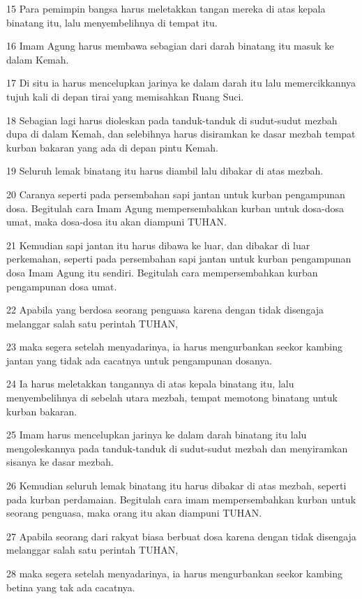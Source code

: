 \par 15 Para pemimpin bangsa harus meletakkan tangan mereka di atas kepala binatang itu, lalu menyembelihnya di tempat itu.
\par 16 Imam Agung harus membawa sebagian dari darah binatang itu masuk ke dalam Kemah.
\par 17 Di situ ia harus mencelupkan jarinya ke dalam darah itu lalu memercikkannya tujuh kali di depan tirai yang memisahkan Ruang Suci.
\par 18 Sebagian lagi harus dioleskan pada tanduk-tanduk di sudut-sudut mezbah dupa di dalam Kemah, dan selebihnya harus disiramkan ke dasar mezbah tempat kurban bakaran yang ada di depan pintu Kemah.
\par 19 Seluruh lemak binatang itu harus diambil lalu dibakar di atas mezbah.
\par 20 Caranya seperti pada persembahan sapi jantan untuk kurban pengampunan dosa. Begitulah cara Imam Agung mempersembahkan kurban untuk dosa-dosa umat, maka dosa-dosa itu akan diampuni TUHAN.
\par 21 Kemudian sapi jantan itu harus dibawa ke luar, dan dibakar di luar perkemahan, seperti pada persembahan sapi jantan untuk kurban pengampunan dosa Imam Agung itu sendiri. Begitulah cara mempersembahkan kurban pengampunan dosa umat.
\par 22 Apabila yang berdosa seorang penguasa karena dengan tidak disengaja melanggar salah satu perintah TUHAN,
\par 23 maka segera setelah menyadarinya, ia harus mengurbankan seekor kambing jantan yang tidak ada cacatnya untuk pengampunan dosanya.
\par 24 Ia harus meletakkan tangannya di atas kepala binatang itu, lalu menyembelihnya di sebelah utara mezbah, tempat memotong binatang untuk kurban bakaran.
\par 25 Imam harus mencelupkan jarinya ke dalam darah binatang itu lalu mengoleskannya pada tanduk-tanduk di sudut-sudut mezbah dan menyiramkan sisanya ke dasar mezbah.
\par 26 Kemudian seluruh lemak binatang itu harus dibakar di atas mezbah, seperti pada kurban perdamaian. Begitulah cara imam mempersembahkan kurban untuk seorang penguasa, maka orang itu akan diampuni TUHAN.
\par 27 Apabila seorang dari rakyat biasa berbuat dosa karena dengan tidak disengaja melanggar salah satu perintah TUHAN,
\par 28 maka segera setelah menyadarinya, ia harus mengurbankan seekor kambing betina yang tak ada cacatnya.
